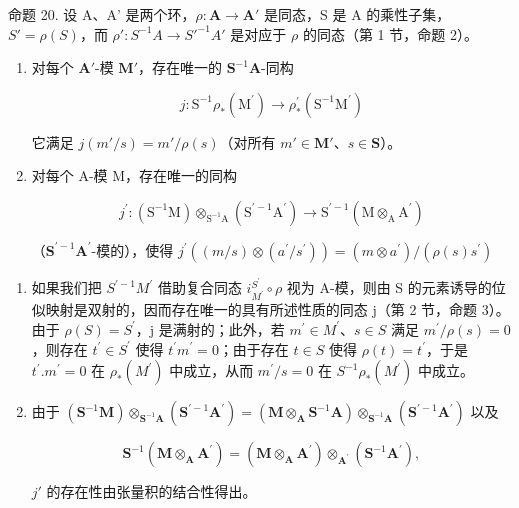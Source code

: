 命题 20. 设 A、A' 是两个环，\(\rho: \mathbf{A} \to \mathbf{A}'\) 是同态，S 是 A 的乘性子集，\(S' = \rho(S)\)，而 \(\rho': S^{-1}A \to S'^{-1}A'\) 是对应于 \(\rho\) 的同态（第 1 节，命题 2）。

\begin{enumerate}
\def\labelenumi{(\roman{enumi})}
\tightlist
\item
  对每个 \(\mathbf{A}'\)-模 \(\mathbf{M}'\)，存在唯一的 \(\mathbf{S}^{-1}\mathbf{A}\)-同构

\[
j \colon \mathrm{S} ^ {- 1} \rho_ {*} (\mathrm{M} ^ {\prime}) \rightarrow \rho_ {*} ^ {\prime} (\mathrm{S} ^ {- 1} \mathrm{M} ^ {\prime})
\]

它满足 \(j(m' / s) = m' / \rho(s)\)（对所有 \(m' \in \mathbf{M}'\)、\(s \in \mathbf{S}\)）。

\item
  对每个 A-模 M，存在唯一的同构

\[
j ^ {\prime} \colon (\mathrm{S} ^ {- 1} \mathrm{M}) \otimes_ {\mathrm{S} ^ {- 1} \mathrm{A}} (\mathrm{S} ^ {\prime - 1} \mathrm{A} ^ {\prime}) \rightarrow \mathrm{S} ^ {\prime - 1} (\mathrm{M} \otimes_ {\mathrm{A}} \mathrm{A} ^ {\prime})
\]

（\(\mathbf{S}^{\prime -1}\mathbf{A}^{\prime}\)-模的），使得 \(j^{\prime}((m / s)\otimes (a^{\prime} / s^{\prime})) = (m\otimes a^{\prime}) / (\rho (s)s^{\prime})\)

\end{enumerate}
\begin{enumerate}
\def\labelenumi{(\roman{enumi})}
\item
  如果我们把 \(S^{\prime-1}M^{\prime}\) 借助复合同态 \(i_{M^{\prime}}^{S^{\prime}}\circ\rho\) 视为 A-模，则由 S 的元素诱导的位似映射是双射的，因而存在唯一的具有所述性质的同态 j（第 2 节，命题 3）。由于 \(\rho(S)=S^{\prime}\)，j 是满射的；此外，若 \(m^{\prime}\in M^{\prime}\)、\(s\in S\) 满足 \(m^{\prime}/\rho(s)=0\)，则存在 \(t^{\prime}\in S^{\prime}\) 使得 \(t^{\prime}m^{\prime}=0\)；由于存在 \(t\in S\) 使得 \(\rho(t)=t^{\prime}\)，于是 \(t^{\prime}.m^{\prime}=0\) 在 \(\rho_{*}(M^{\prime})\) 中成立，从而 \(m^{\prime}/s=0\) 在 \(S^{-1}\rho_{*}(M^{\prime})\) 中成立。
\item
  由于 \((\mathbf{S}^{-1}\mathbf{M})\otimes_{\mathbf{S}^{-1}\mathbf{A}}(\mathbf{S}^{\prime -1}\mathbf{A}^{\prime}) = (\mathbf{M}\otimes_{\mathbf{A}}\mathbf{S}^{-1}\mathbf{A})\otimes_{\mathbf{S}^{-1}\mathbf{A}}(\mathbf{S}^{\prime -1}\mathbf{A}^{\prime})\) 以及

\[
\mathbf {S} ^ {- 1} (\mathbf {M} \otimes_ {\mathbf {A}} \mathbf {A} ^ {\prime}) = (\mathbf {M} \otimes_ {\mathbf {A}} \mathbf {A} ^ {\prime}) \otimes_ {\mathbf {A} ^ {\prime}} (\mathbf {S} ^ {- 1} \mathbf {A} ^ {\prime}),
\]

\(j'\) 的存在性由张量积的结合性得出。

\end{enumerate}
